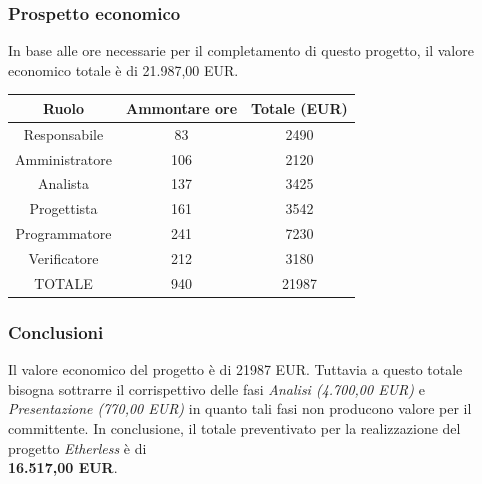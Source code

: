 \subsubsection{Prospetto economico}
In base alle ore necessarie per il completamento di questo progetto, il valore economico totale è di 21.987,00 EUR.
\begin{center}
\begin{tabular}{ |c|c|c|  }
 \hline
 Ruolo 		& Ammontare ore 	& Totale (EUR)\\
 \hline
 \hline
 	Responsabile	& 83 	& 2490\\
	Amministratore	& 106		& 2120\\
	Analista		& 137 		& 3425\\
	Progettista		& 161		& 3542\\
	Programmatore	& 241		& 7230\\
	Verificatore	& 212 	& 3180\\
 \hline\hline
 TOTALE		& 940		& 21987\\
  \hline
\end{tabular}
\end{center}

\subsubsection{Conclusioni}
Il valore economico del progetto è di 21987 EUR. Tuttavia a questo totale bisogna sottrarre il corrispettivo delle fasi \textit{Analisi (4.700,00 EUR)} e \textit{Presentazione (770,00 EUR)} in quanto tali fasi non producono valore per il committente.
\newline
\newline
In conclusione, il totale preventivato per la realizzazione del progetto \textit{Etherless} è di\\ \textbf{16.517,00 EUR}.